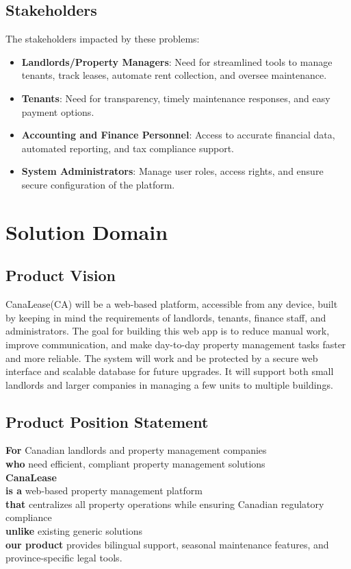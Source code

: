 \documentclass[12pt]{article}
\begin{document}
\subsection{Stakeholders}
The stakeholders impacted by these problems:

\begin{itemize}
    \item \textbf{Landlords/Property Managers}: Need for streamlined tools to manage tenants, track leases, automate rent collection, and oversee maintenance.
    \item \textbf{Tenants}: Need for transparency, timely maintenance responses, and easy payment options.
    \item \textbf{Accounting and Finance Personnel}: Access to accurate financial data, automated reporting, and tax compliance support.
    \item \textbf{System Administrators}: Manage user roles, access rights, and ensure secure configuration of the platform.
\end{itemize}

\section{Solution Domain}

\subsection{Product Vision}
CanaLease(CA) will be a web-based platform, accessible from any device, built by keeping in mind the requirements of landlords, tenants, finance staff, and administrators. The goal for building this web app is to reduce manual work, improve communication, and make day-to-day property management tasks faster and more reliable. The system will work and be protected by a secure web interface and scalable database for future upgrades. It will support both small landlords and larger companies in managing a few units to multiple buildings.

\subsection{Product Position Statement}
\textbf{For} Canadian landlords and property management companies \\
\textbf{who} need efficient, compliant property management solutions \\
\textbf{CanaLease} \\
\textbf{is a} web-based property management platform \\
\textbf{that} centralizes all property operations while ensuring Canadian regulatory compliance \\
\textbf{unlike} existing generic solutions \\
\textbf{our product} provides bilingual support, seasonal maintenance features, and province-specific legal tools.
\end{document}
